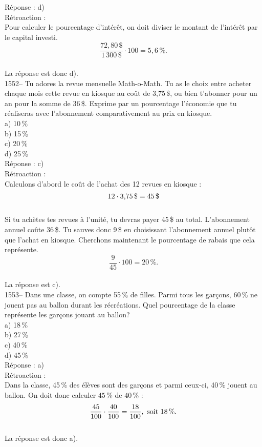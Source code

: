 R\'eponse : d)\\

R\'etroaction :\\
Pour calculer le pourcentage d'int\'er\^et, on doit diviser le
montant de l'int\'er\^et par le capital investi.
$$\frac{72,80\,\$}{1\,300\,\$}\cdot100=5,6\,\%.$$\\
La r\'eponse est donc d).\\

1552-- Tu adores la revue mensuelle Math-o-Math. Tu as le choix entre
acheter chaque mois cette revue en kiosque au co\^ut de 3,75\,\$, ou
bien t'abonner pour un an pour la somme de 36\,\$. Exprime par un
pourcentage l'\'economie que tu r\'ealiseras avec l'abonnement
comparativement au prix en kiosque.\\
a) 10\,\%\\
b) 15\,\%\\
c) 20\,\%\\
d) 25\,\%\\

R\'eponse : c)\\

R\'etroaction :\\
Calculons d'abord le co\^ut de l'achat des 12 revues en kiosque :
$$12\cdot{\textrm{3,75\,\$}}={\textrm{45\,\$}}$$\\
Si tu ach\`etes tes revues \`a l'unit\'e, tu devras payer 45\,\$ au total.
L'abonnement annuel co\^ute 36\,\$. Tu sauves donc 9\,\$ en
choisissant l'abonnement annuel plut\^ot que l'achat en kiosque.
Cherchons maintenant le pourcentage de rabais que cela repr\'esente.
$$\frac{9}{45}\cdot100=20\,\%.$$\\ La r\'eponse est c).\\

1553-- Dans une classe, on compte 55\,\% de filles. Parmi tous les
gar\c cons, 60\,\% ne jouent pas au ballon durant les
r\'ecr\'eations. Quel
pourcentage de la classe repr\'esente les gar\c cons jouant au ballon?\\
a) 18\,\%\\
b) 27\,\%\\
c) 40\,\%\\
d) 45\,\%\\

R\'eponse : a)\\

R\'etroaction :\\
Dans la classe, 45\,\% des \'el\`eves sont des gar\c cons et parmi
ceux-ci, 40\,\% jouent au ballon. On doit donc calculer $45\,\%$ de
$40\,\%$ :
\\$$\frac{45}{100}\cdot\frac{40}{100}=\frac{18}{100},{\textrm{ soit
18\,\%.}}$$\\
La r\'eponse est donc a).\\

